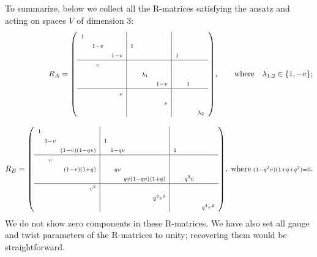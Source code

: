 \documentclass[11pt]{article}
\def\ba{\begin{eqnarray}}\def\ea{\end{eqnarray}}
\begin{document}
To summarize, below we collect all the R-matrices satisfying the ansatz and acting on spaces $V$ of dimension 3:
\ba
\lb{dim3-R}
\phantom{a}\hspace{-50mm}
R_{A}=\left(
\begin{array}{lcr|lcr|lcr}
\scriptstyle	1 &  &  &  & & & & &
	\\
	 &\scriptstyle 1-v &  & \scriptstyle 1 & & & & &
	\\
	 &  &\scriptstyle 1-v  &  & & &\scriptstyle 1 & &
	\\
	\hline
	&\scriptstyle v &  & & & & & &
	\\
	&  &  & &\scriptstyle \lambda_1 & & & &
	\\	
	&  &  & & &\scriptstyle 1-v &  &\scriptstyle 1 &
	\\
	\hline
		&  &\scriptstyle v & & & & & &
	\\
		&  &  & & &\scriptstyle v & & &
	\\
		& &  & & & & & &\scriptstyle \lambda_2
\end{array}
\right)\! ,\qquad\mbox{where}\quad \lambda_{1,2}\in\{1,-v\};
\\[8pt]
R_{B}=\left(
\begin{array}{lcr|lcr|lcr}
	\scriptstyle	1 &  &  &  & & & & &
	\\
	&\hspace{-2mm}\scriptstyle 1-v &  & \scriptstyle 1 & & & & &
	\\
	&  &\hspace{-4mm}\scriptstyle (1-v)(1-q v)  &  &\hspace{-2mm}\scriptstyle 1-q v & &\scriptstyle 1 & &
	\\
	\hline
	&\hspace{-2mm}\scriptstyle v &  & & & & & &
	\\
	&  & \scriptstyle (1- v)(1+q) & &\hspace{-2mm}\scriptstyle q v & & & &
	\\	
	&  &  & & &\hspace{-4mm}\scriptstyle q v (1- q v)(1+q) & & \scriptstyle q^2 v &
	\\
	\hline
	&  &\scriptstyle v^2 & & & & & &
	\\
	&  &  & & &\scriptstyle q^2v^2 & & &
	\\
	& &  & & & & & &\scriptstyle q^4 v^2
\end{array}
\right)\!, \; \mbox{where}\; {\scriptstyle (1-q^2 v)(1+q+q^2)=0}.
\ea
We do not show zero components in these R-matrices. We have also set all gauge and twist parameters of the R-matrices to unity; recovering them would be straightforward. 
\end{document}
